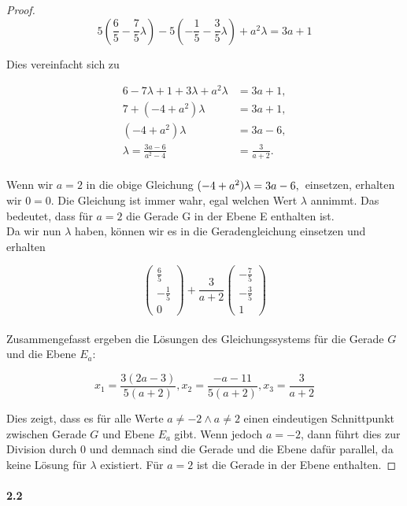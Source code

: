 \documentclass[12pt, letterpaper]{article}
\begin{document}
\begin{proof}
$$
5(\frac{6}{5}-\frac{7}{5}\lambda)-5(-\frac{1}{5}-\frac{3}{5}\lambda)+a^{2}\lambda=3a+1
$$

\noindent Dies vereinfacht sich zu

\[
\begin{aligned}
6 - 7\lambda + 1 + 3\lambda + a^2 \lambda &= 3a + 1, \\
7 + (-4 + a^2)\lambda &= 3a + 1, \\
(-4 + a^2)\lambda &= 3a - 6, \\
\lambda = \frac{3a - 6}{a^2 -4} &= \frac{3}{a + 2}.
\end{aligned}
\]\\

\noindent Wenn wir $a = 2$ in die obige Gleichung $(-4 + a^2)\lambda = 3a - 6, \\$ einsetzen, erhalten wir $0 = 0$. Die Gleichung ist immer wahr, egal welchen Wert $\lambda$ annimmt. Das bedeutet, dass für $a = 2$ die Gerade G in der Ebene E enthalten ist.\\

\noindent Da wir nun $\lambda$ haben, können wir es in die Geradengleichung einsetzen und erhalten

$$
\begin{pmatrix} \frac{6}{5} \\ -\frac{1}{5} \\ 0 \end{pmatrix} + \frac{3}{a+2} \begin{pmatrix} -\frac{7}{5} \\ -\frac{3}{5} \\ 1 \end{pmatrix}
$$\\

\noindent Zusammengefasst ergeben die Lösungen des Gleichungssystems für die Gerade $G$ und die Ebene $E_a$:

$$x_1 = \frac{3(2a-3)}{5(a+2)}, x_2 = \frac{-a-11}{5(a+2)}, x_3 = \frac{3}{a+2}$$

\noindent Dies zeigt, dass es für alle Werte $a \neq -2 \land a \neq 2$ einen eindeutigen Schnittpunkt zwischen Gerade $G$ und Ebene $E_a$ gibt. Wenn jedoch $a = -2$, dann führt dies zur Division durch 0 und demnach sind die Gerade und die Ebene dafür parallel, da keine Lösung für $\lambda$ existiert. Für $a = 2$ ist die Gerade in der Ebene enthalten.

\end{proof}

\paragraph{2.2} 
\end{document}
